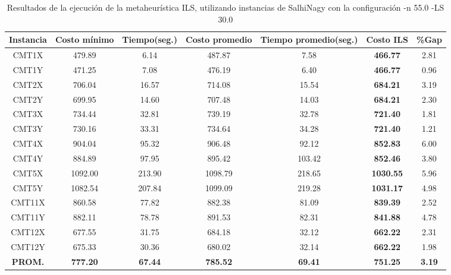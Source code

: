 \begin{table}[ht]
\caption{Resultados de la ejecución de la metaheurística ILS, utilizando instancias de SalhiNagy con la configuración -n 55.0 -LS 30.0}
\centering
\small
\begin{tabular}{c c c c c c c}
\hline\hline
Instancia & Costo mínimo & Tiempo(seg.) & Costo promedio & Tiempo promedio(seg.) & Costo ILS & \%Gap \\ [0.5ex]
\hline
CMT1X & 479.89 & 6.14 & 
487.87 & 7.58 & \bf{466.77} & 
2.81\\CMT1Y & 471.25 & 7.08 & 
476.19 & 6.40 & \bf{466.77} & 
0.96\\CMT2X & 706.04 & 16.57 & 
714.08 & 15.54 & \bf{684.21} & 
3.19\\CMT2Y & 699.95 & 14.60 & 
707.48 & 14.03 & \bf{684.21} & 
2.30\\CMT3X & 734.44 & 32.81 & 
739.19 & 32.78 & \bf{721.40} & 
1.81\\CMT3Y & 730.16 & 33.31 & 
734.64 & 34.28 & \bf{721.40} & 
1.21\\CMT4X & 904.04 & 95.32 & 
906.48 & 92.12 & \bf{852.83} & 
6.00\\CMT4Y & 884.89 & 97.95 & 
895.42 & 103.42 & \bf{852.46} & 
3.80\\CMT5X & 1092.00 & 213.90 & 
1098.79 & 218.65 & \bf{1030.55} & 
5.96\\CMT5Y & 1082.54 & 207.84 & 
1099.09 & 219.28 & \bf{1031.17} & 
4.98\\CMT11X & 860.58 & 77.82 & 
882.38 & 81.09 & \bf{839.39} & 
2.52\\CMT11Y & 882.11 & 78.78 & 
891.53 & 82.31 & \bf{841.88} & 
4.78\\CMT12X & 677.55 & 31.75 & 
684.18 & 32.12 & \bf{662.22} & 
2.31\\CMT12Y & 675.33 & 30.36 & 
680.02 & 32.14 & \bf{662.22} & 
1.98\\\bf{PROM.} & 
\bf{777.20} & \bf{67.44} & \bf{785.52} & \bf{69.41} & \bf{751.25} & \bf{3.19}\\[1ex]\hline
\end{tabular}
\label{table:nonlin}
\end{table} \clearpage
